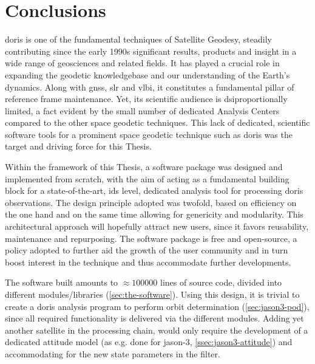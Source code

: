 \section{Conclusions}\label{sec:conclusions}

\gls{doris} is one of the fundamental techniques of Satellite Geodesy, steadily contributing 
since the early 1990s significant results, products and insight in a wide range of geosciences 
and related fields. It has played a crucial role in expanding the geodetic knowledgebase 
and our understanding of the Earth's dynamics. Along with \gls{gnss}, \gls{slr} and 
\gls{vlbi}, it constitutes a fundamental pillar of reference frame maintenance. Yet, 
its scientific audience is dsiproportionally limited, a fact evident by the small number 
of dedicated Analysis Centers compared to the other space geodetic techniques. This 
lack of dedicated, scientific software tools for a prominent space geodetic technique 
such as \gls{doris} was the target and driving force for this Thesis.

Within the framework of this Thesis, a software package was designed and implemented from scratch, 
with the aim of acting as a fundamental building block for a state-of-the-art, \gls{ids} 
level, dedicated analysis tool for processing \gls{doris} observations. The design 
principle adopted was twofold, based on efficiency on the one hand and on the same time 
allowing for genericity and modularity. This architectural approach will hopefully 
attract new users, since it favors reusability, maintenance and repurposing. The software 
package is free and open-source, a policy adopted to further aid the growth of the 
user community and in turn boost interest in the technique and thus accommodate further 
developments.

The software built amounts to $\approx 100000$ lines of source code, divided into 
different modules/libraries (\autoref{sec:the-software}). Using this design, it is 
trivial to create a \gls{doris} analysis program to perform orbit determination 
(\autoref{sec:jason3-pod}), since all required functionality is delivered via the 
different modules. Adding yet another satellite in the processing chain, would only 
require the development of a dedicated attitude model (as e.g. done for \gls{jason}-3, \autoref{ssec:jason3-attitude}) 
and accommodating for the new state parameters in the filter.

